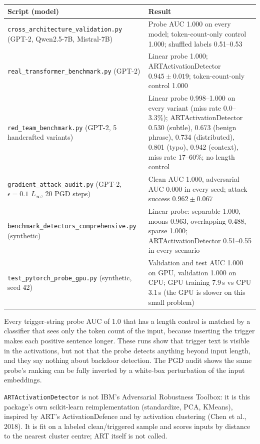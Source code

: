 \documentclass[11pt,letterpaper]{article}
\begin{document}
\begin{center}
\begin{tabular}{L{5.2cm}L{8.3cm}}
\toprule
\textbf{Script (model)} & \textbf{Result} \\
\midrule
{} \texttt{cross\_architecture\_\allowbreak validation.py} (GPT-2, Qwen2.5-7B, Mistral-7B) & Probe AUC 1.000 on every model; token-count-only control 1.000; shuffled labels 0.51--0.53 \\
\texttt{real\_transformer\_\allowbreak benchmark.py} (GPT-2) & Linear probe 1.000; ARTActivationDetector $0.945 \pm 0.019$; token-count-only control 1.000 \\
 \texttt{red\_team\_benchmark.py} (GPT-2, 5 handcrafted variants) & Linear probe 0.998--1.000 on every variant (miss rate 0.0--3.3\%); ARTActivationDetector 0.530 (subtle), 0.673 (benign phrase), 0.734 (distributed), 0.801 (typo), 0.942 (context), miss rate 17--60\%; no length control \\
\texttt{gradient\_attack\_audit.py} (GPT-2, $\epsilon = 0.1$ $L_\infty$, 20 PGD steps) & Clean AUC 1.000, adversarial AUC 0.000 in every seed; attack success $0.962 \pm 0.067$ \\
 \texttt{benchmark\_detectors\_\allowbreak comprehensive.py} (synthetic) & Linear probe: separable 1.000, moons 0.963, overlapping 0.488, sparse 1.000; ARTActivationDetector 0.51--0.55 in every scenario \\
\texttt{test\_pytorch\_probe\_gpu.py} (synthetic, seed 42) & Validation and test AUC 1.000 on GPU, validation 1.000 on CPU; GPU training 7.9\,s vs CPU 3.1\,s (the GPU is slower on this small problem) \\
\bottomrule
\end{tabular}
\end{center}

\begin{infobox}
Every trigger-string probe AUC of 1.0 that has a length control is matched by a classifier that sees only the token count of the input, because inserting the trigger makes each positive sentence longer. These runs show that trigger text is visible in the activations, but not that the probe detects anything beyond input length, and they say nothing about backdoor detection. The PGD audit shows the same probe's ranking can be fully inverted by a white-box perturbation of the input embeddings.

\texttt{ARTActivationDetector} is not IBM's Adversarial Robustness Toolbox: it is this package's own scikit-learn reimplementation (standardize, PCA, KMeans), inspired by ART's ActivationDefence and by activation clustering (Chen et al., 2018). It is fit on a labeled clean/triggered sample and scores inputs by distance to the nearest cluster centre; ART itself is not called.
\end{infobox}
\end{document}
